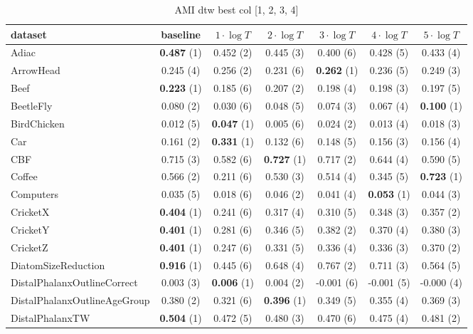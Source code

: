     \begin{table}[ht]
    \caption{AMI dtw best col [1, 2, 3, 4]} 
    \begin{adjustbox}{width=\textwidth}
    \begin{tabular}{lcccccc}
    \hline
    dataset & baseline & \textbf{$1\cdot \log{T}$} & \textbf{$2\cdot \log{T}$} & \textbf{$3\cdot \log{T}$} & \textbf{$4\cdot \log{T}$} & \textbf{$5\cdot \log{T}$} \\ \hline
    Adiac & \textbf{0.487} (1) & 0.452 (2) & 0.445 (3) & 0.400 (6) & 0.428 (5) & 0.433 (4) \\
    ArrowHead & 0.245 (4) & 0.256 (2) & 0.231 (6) & \textbf{0.262} (1) & 0.236 (5) & 0.249 (3) \\
    Beef & \textbf{0.223} (1) & 0.185 (6) & 0.207 (2) & 0.198 (4) & 0.198 (3) & 0.197 (5) \\
    BeetleFly & 0.080 (2) & 0.030 (6) & 0.048 (5) & 0.074 (3) & 0.067 (4) & \textbf{0.100} (1) \\
    BirdChicken & 0.012 (5) & \textbf{0.047} (1) & 0.005 (6) & 0.024 (2) & 0.013 (4) & 0.018 (3) \\
    Car & 0.161 (2) & \textbf{0.331} (1) & 0.132 (6) & 0.148 (5) & 0.156 (3) & 0.156 (4) \\
    CBF & 0.715 (3) & 0.582 (6) & \textbf{0.727} (1) & 0.717 (2) & 0.644 (4) & 0.590 (5) \\
    Coffee & 0.566 (2) & 0.211 (6) & 0.530 (3) & 0.514 (4) & 0.345 (5) & \textbf{0.723} (1) \\
    Computers & 0.035 (5) & 0.018 (6) & 0.046 (2) & 0.041 (4) & \textbf{0.053} (1) & 0.044 (3) \\
    CricketX & \textbf{0.404} (1) & 0.241 (6) & 0.317 (4) & 0.310 (5) & 0.348 (3) & 0.357 (2) \\
    CricketY & \textbf{0.401} (1) & 0.281 (6) & 0.346 (5) & 0.382 (2) & 0.370 (4) & 0.380 (3) \\
    CricketZ & \textbf{0.401} (1) & 0.247 (6) & 0.331 (5) & 0.336 (4) & 0.336 (3) & 0.370 (2) \\
    DiatomSizeReduction & \textbf{0.916} (1) & 0.445 (6) & 0.648 (4) & 0.767 (2) & 0.711 (3) & 0.564 (5) \\
    DistalPhalanxOutlineCorrect & 0.003 (3) & \textbf{0.006} (1) & 0.004 (2) & -0.001 (6) & -0.001 (5) & -0.000 (4) \\
    DistalPhalanxOutlineAgeGroup & 0.380 (2) & 0.321 (6) & \textbf{0.396} (1) & 0.349 (5) & 0.355 (4) & 0.369 (3) \\
    DistalPhalanxTW & \textbf{0.504} (1) & 0.472 (5) & 0.480 (3) & 0.470 (6) & 0.475 (4) & 0.481 (2) \\

\end{tabular}
\end{adjustbox}
\end{table}
